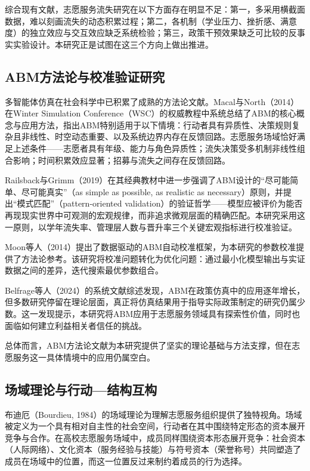 \documentclass[12pt,a4paper]{article}
\begin{document}
综合现有文献，志愿服务流失研究在以下方面存在明显不足：第一，多采用横截面数据，难以刻画流失的动态积累过程；第二，各机制（学业压力、挫折感、满意度）的独立效应与交互效应缺乏系统检验；第三，政策干预效果缺乏可比较的反事实实验设计。本研究正是试图在这三个方向上做出推进。

\subsection{ABM方法论与校准验证研究}

多智能体仿真在社会科学中已积累了成熟的方法论文献。Macal与North（2014）在Winter Simulation Conference（WSC）的权威教程中系统总结了ABM的核心概念与应用方法，指出ABM特别适用于以下情境：行动者具有异质性、决策规则复杂且非线性、时空动态重要、以及系统边界内存在反馈回路。志愿服务场域恰好满足上述条件——志愿者具有年级、能力与角色异质性；流失决策受多机制非线性组合影响；时间积累效应显著；招募与流失之间存在反馈回路。

Railsback与Grimm（2019）在其经典教材中进一步强调了ABM设计的“尽可能简单、尽可能真实”（as simple as possible, as realistic as necessary）原则，并提出“模式匹配”（pattern-oriented validation）的验证哲学——模型应被评价为能否再现现实世界中可观测的宏观规律，而非追求微观层面的精确匹配。本研究采用这一原则，以学年流失率、管理层人数与晋升率三个关键宏观指标进行校准验证。

Moon等人（2014）提出了数据驱动的ABM自动校准框架，为本研究的参数校准提供了方法论参考。该研究将校准问题转化为优化问题：通过最小化模型输出与实证数据之间的差异，迭代搜索最优参数组合。

Belfrage等人（2024）的系统文献综述发现，ABM在政策仿真中的应用逐年增长，但多数研究停留在理论层面，真正将仿真结果用于指导实际政策制定的研究仍属少数。这一发现提示，本研究将ABM应用于志愿服务领域具有探索性价值，同时也面临如何建立利益相关者信任的挑战。

总体而言，ABM方法论文献为本研究提供了坚实的理论基础与方法支撑，但在志愿服务这一具体情境中的应用仍属空白。

\subsection{场域理论与行动—结构互构}

布迪厄（Bourdieu, 1984）的场域理论为理解志愿服务组织提供了独特视角。场域被定义为一个具有相对自主性的社会空间，行动者在其中围绕特定形态的资本展开竞争与合作。在高校志愿服务场域中，成员同样围绕资本形态展开竞争：社会资本（人际网络）、文化资本（服务经验与技能）与符号资本（荣誉称号）共同塑造了成员在场域中的位置，而这一位置反过来制约着成员的行为选择。
\end{document}
